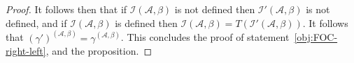 \documentclass[../main/thesis.tex]{subfiles}
\begin{document}
\begin{proof}
  It follows then that if $\mathcal{I}(\mathcal{A}, \beta)$ is not defined then
  $\mathcal{I}'(\mathcal{A}, \beta)$ is not defined, and if
  $\mathcal{I}(\mathcal{A}, \beta)$ is defined then $\mathcal{I}(\mathcal{A},
  \beta) = T(\mathcal{I}'(\mathcal{A}, \beta))$. It follows that
  $(\gamma')^{(\mathcal{A}, \beta)} = \gamma^{(\mathcal{A}, \beta)}$. This
  concludes the proof of statement~\ref{obj:FOC-right-left}, and the
  proposition.
  

  


\end{proof}
\end{document}
